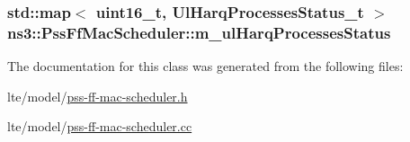 \subsubsection[{\texorpdfstring{m\+\_\+ul\+Harq\+Processes\+Status}{m_ulHarqProcessesStatus}}]{\setlength{\rightskip}{0pt plus 5cm}std\+::map$<$ uint16\+\_\+t, {\bf Ul\+Harq\+Processes\+Status\+\_\+t} $>$ ns3\+::\+Pss\+Ff\+Mac\+Scheduler\+::m\+\_\+ul\+Harq\+Processes\+Status\hspace{0.3cm}{\ttfamily [private]}}\hypertarget{classns3_1_1PssFfMacScheduler_a80badd341a079bd237ef7fe60db2cb79}{}\label{classns3_1_1PssFfMacScheduler_a80badd341a079bd237ef7fe60db2cb79}


The documentation for this class was generated from the following files\+:\begin{DoxyCompactItemize}
\item 
lte/model/\hyperlink{lte_2model_2pss-ff-mac-scheduler_8h}{pss-\/ff-\/mac-\/scheduler.\+h}\item 
lte/model/\hyperlink{lte_2model_2pss-ff-mac-scheduler_8cc}{pss-\/ff-\/mac-\/scheduler.\+cc}\end{DoxyCompactItemize}
